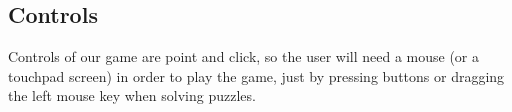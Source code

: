 \subsection{Controls}
Controls of our game are point and click, so the user will need a mouse (or a touchpad screen) in order to play the game, just by pressing buttons or dragging the left mouse key when solving puzzles.\\




